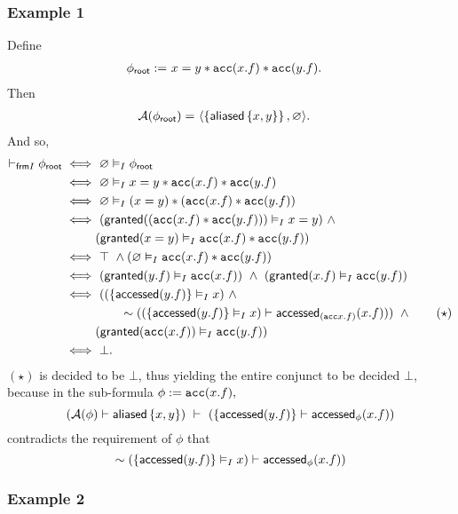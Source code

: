 \subsubsection*{Example 1}

Define
\begin{align*}
{\phi_\textsf{root}} := & \ x = y \ast \texttt{acc}(x.f) \ast \texttt{acc}(y.f).
\end{align*}
Then
\begin{align*}
\mathcal{A}({\phi_\textsf{root}}) = & \ \langle  \left\{ \textsf{aliased}\left\{ x,y \right\} \right\} ,  \varnothing  \rangle.
\end{align*}
And so,
\begin{align*}
\vdash_{\textsf{frm}I} {\phi_\textsf{root}}
\iff & \
\varnothing \vDash_I {\phi_\textsf{root}}
\\ \iff & \
\varnothing \vDash_I x = y \ast \texttt{acc}(x.f) \ast \texttt{acc}(y.f)
\\ \iff & \
\varnothing \vDash_I (x = y) \ast (\texttt{acc}(x.f) \ast \texttt{acc}(y.f))
\\ \iff & \
(\textsf{granted}((\texttt{acc}(x.f) \ast \texttt{acc}(y.f))) \vDash_I x = y) \ \land \\ &
(\textsf{granted}(x = y) \vDash_I \texttt{acc}(x.f) \ast \texttt{acc}(y.f))
\\ \iff & \
\top \ \land (\varnothing \vDash_I \texttt{acc}(x.f) \ast \texttt{acc}(y.f))
\\ \iff & \
(\textsf{granted}(y.f) \vDash_I \texttt{acc}(x.f)) \ \land \
(\textsf{granted}(x.f) \vDash_I \texttt{acc}(y.f))
\\ \iff & \
(
  (\left\{  \textsf{accessed}(y.f)  \right\} \vDash_I x) \ \land \\ & \hspace{2em}
  \sim ((\left\{  \textsf{accessed}(y.f)  \right\} \vDash_I x) \vdash \textsf{accessed}_{(\texttt{acc}{x.f})}(x.f))
)
\ \land \tag{$\star$} \\ &
(\textsf{granted}(\texttt{acc}(x.f)) \vDash_I \texttt{acc}(y.f))
\\ \iff & \
\bot.
\end{align*}
$(\star)$ is decided to be $\bot$, thus yielding the entire conjunct to be decided $\bot$, because in the sub-formula $\phi := \texttt{acc}(x.f),$
$$
  (\mathcal{A}(\phi) \vdash \textsf{aliased}\left\{ x,y \right\}) \ \vdash \
  (\left\{  \textsf{accessed}(y.f)  \right\} \vdash \textsf{accessed}_{\phi}(x.f))
$$
contradicts the requirement of $\phi$ that
$$
  \sim (\left\{  \textsf{accessed}(y.f)  \right\} \vDash_I x) \vdash \textsf{accessed}_\phi(x.f))
$$

\newpage
\subsubsection*{Example 2}

